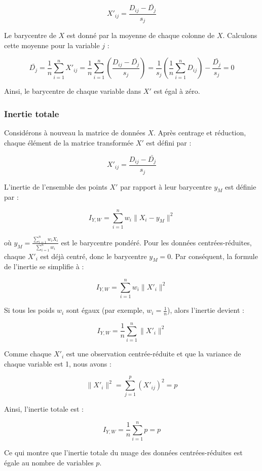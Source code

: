 \documentclass[
]{article}
\begin{document}
\[
X'_{ij} = \frac{D_{ij} - \bar{D_{j}}}{s_{j}}
\]

Le barycentre de \(X\) est donné par la moyenne de chaque colonne de
\(X\). Calculons cette moyenne pour la variable \(j\) :

\[
\bar{D_{j}} = \frac{1}{n} \sum_{i=1}^{n} X'_{ij} = \frac{1}{n} \sum_{i=1}^{n} \left( \frac{D_{ij} - \bar{D_{j}}}{s_{j}} \right) 
= \frac{1}{s_{j}} \left( \frac{1}{n} \sum_{i=1}^{n} D_{ij} \right) - \frac{\bar{D_{j}}}{s_{j}} = 0
\]

Ainsi, le barycentre de chaque variable dans \(X'\) est égal à zéro.

\hypertarget{inertie-totale}{%
\subsubsection{Inertie totale}\label{inertie-totale}}

Considérons à nouveau la matrice de données \(X\). Après centrage et
réduction, chaque élément de la matrice transformée \(X'\) est défini
par :

\[
X'_{ij} = \frac{D_{ij} - \bar{D_{j}}}{s_{j}}
\]

L'inertie de l'ensemble des points \(X'\) par rapport à leur barycentre
\(y_M\) est définie par :

\[
I_{Y,W} = \sum_{i=1}^{n} w_{i} \|X_{i} - y_M\|^{2}
\]

où \(y_M = \frac{\sum_{i=1}^{n} w_{i} X_{i}}{\sum_{i=1}^{n} w_{i}}\) est
le barycentre pondéré. Pour les données centrées-réduites, chaque
\(X'_{i}\) est déjà centré, donc le barycentre \(y_M = 0\). Par
conséquent, la formule de l'inertie se simplifie à :

\[
I_{Y,W} = \sum_{i=1}^{n} w_{i} \|X'_{i}\|^{2}
\]

Si tous les poids \(w_{i}\) sont égaux (par exemple,
\(w_{i} = \frac{1}{n}\)), alors l'inertie devient :

\[
I_{Y,W} = \frac{1}{n} \sum_{i=1}^{n} \|X'_{i}\|^{2}
\]

Comme chaque \(X'_{i}\) est une observation centrée-réduite et que la
variance de chaque variable est 1, nous avons :

\[
\|X'_{i}\|^{2} = \sum_{j=1}^{p} (X'_{ij})^{2} = p
\]

Ainsi, l'inertie totale est :

\[
I_{Y,W} = \frac{1}{n} \sum_{i=1}^{n} p = p
\]

Ce qui montre que l'inertie totale du nuage des données
centrées-réduites est égale au nombre de variables \(p\).
\end{document}
